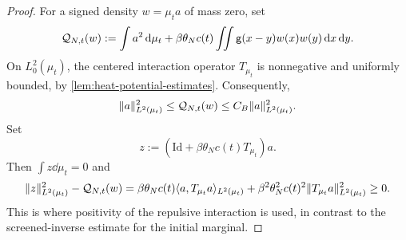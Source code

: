 \documentclass[11pt,reqno]{amsart}
\numberwithin{equation}{section}
\theoremstyle{plain}
\theoremstyle{remark}
\DeclarePairedDelimiter{\norm}{\lVert}{\rVert}
\newcommand{\Id}{\mathrm{Id}}
\begin{document}
\begin{proof}
For a signed density $w=\mu_ta$ of mass zero, set
\begin{equation}\label{eq:screened-energy}
 \mathcal Q_{N,t}(w):=\int a^2\,\mathrm d\mu_t+
              \beta\theta_Nc(t)\iint\mathsf g(x-y)w(x)w(y)\,\mathrm d x\,\mathrm d y.
\end{equation}
On $L^2_0(\mu_t)$, the centered interaction operator $T_{\mu_t}$ is nonnegative and uniformly bounded, by \cref{lem:heat-potential-estimates}. Consequently,
\begin{equation}\label{eq:screened-comparison}
 \norm a_{L^2(\mu_t)}^2\le\mathcal Q_{N,t}(w)\le C_B\norm a_{L^2(\mu_t)}^2.
\end{equation}
Set
\begin{equation}\label{eq:homogeneous-screened-variable}
 z:=\left(\Id+\beta\theta_Nc(t)T_{\mu_t}\right)a.
\end{equation}
Then $\int z\dd\mu_t=0$ and
\begin{equation}\label{eq:screened-z-bound}
 \norm z_{L^2(\mu_t)}^2-\mathcal Q_{N,t}(w)
 =\beta\theta_Nc(t)\langle a,T_{\mu_t}a\rangle_{L^2(\mu_t)}
   +\beta^2\theta_N^2c(t)^2\norm{T_{\mu_t}a}_{L^2(\mu_t)}^2\ge0.
\end{equation}
This is where positivity of the repulsive interaction is used, in contrast to the screened-inverse estimate for the initial marginal.


\end{proof}
\end{document}
